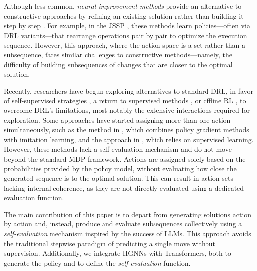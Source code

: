 Although less common, \emph{neural improvement methods} provide an alternative to constructive approaches by refining an existing solution rather than building it step by step \cite{garmendia2023neural}. For example, in the JSSP \cite{zhang2024deep}, these methods learn policies—often via DRL variants—that rearrange operations pair by pair to optimize the execution sequence. However, this approach, where the action space is a set rather than a subsequence, faces similar challenges to constructive methods—namely, the difficulty of building subsequences of changes that are closer to the optimal solution.

Recently, researchers have begun exploring alternatives to standard DRL, in favor of self-supervised strategies \cite{corsini2024self, pirnay2024self}, a return to supervised methods \cite{drakulic2024bq}, or offline RL \cite{echeverria2024offline}, to overcome DRL’s limitations, most notably the extensive interactions required for exploration. Some approaches have started assigning more than one action simultaneously, such as the method in \citep{tassel2023end}, which combines policy gradient methods with imitation learning, and the approach in \citep{echeverria2024multi}, which relies on supervised learning. However, these methods lack a self-evaluation mechanism and do not move beyond the standard MDP framework. Actions are assigned solely based on the probabilities provided by the policy model, without evaluating how close the generated sequence is to the optimal solution. This can result in action sets lacking internal coherence, as they are not directly evaluated using a dedicated evaluation function.

The main contribution of this paper is to depart from generating solutions action by action and, instead, produce and evaluate subsequences collectively using a \emph{self-evaluation} mechanism inspired by the success of LLMs. This approach avoids the traditional stepwise paradigm of predicting a single move without supervision. Additionally, we integrate HGNNs with Transformers, both to generate the policy and to define the \emph{self-evaluation} function.



 





